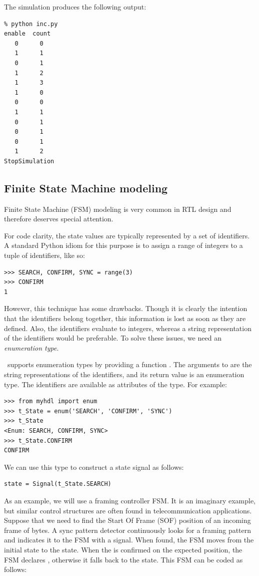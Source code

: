 The simulation produces the following output:
\begin{verbatim}
% python inc.py
enable  count
   0      0
   1      1
   0      1
   1      2
   1      3
   1      0
   0      0
   1      1
   0      1
   0      1
   0      1
   1      2
StopSimulation
\end{verbatim}


\subsection{Finite State Machine modeling \label{model-fsm}}

Finite State Machine (FSM) modeling is very common in RTL
design and therefore deserves special attention.

For code clarity, the state values are typically represented by a set
of identifiers. A standard Python idiom for this purpose is to assign
a range of integers to a tuple of identifiers, like so:

\begin{verbatim}
>>> SEARCH, CONFIRM, SYNC = range(3)
>>> CONFIRM
1
\end{verbatim}

However, this technique has some drawbacks. Though it is clearly
the intention that the identifiers belong together, this information
is lost as soon as they are defined. Also, the identifiers evaluate to
integers, whereas a string representation of the identifiers
would be preferable. To solve these issues, we need an
\emph{enumeration type}.

\myhdl\ supports enumeration types by providing a function
.  The arguments to  are the string
representations of the identifiers, and its return value is an
enumeration type. The identifiers are available as attributes of the
type. For example:

\begin{verbatim}
>>> from myhdl import enum
>>> t_State = enum('SEARCH', 'CONFIRM', 'SYNC')
>>> t_State
<Enum: SEARCH, CONFIRM, SYNC>
>>> t_State.CONFIRM
CONFIRM
\end{verbatim}

We can use this type to construct a state signal as follows:

\begin{verbatim}
state = Signal(t_State.SEARCH)
\end{verbatim}

As an example, we will use a framing controller FSM.  It is an
imaginary example, but similar control structures are often found in
telecommunication applications. Suppose that we need to find the
Start Of Frame (SOF) position of an incoming frame of bytes.
A sync pattern detector continuously looks for a framing
pattern and indicates it to the FSM with a  signal. When
found, the FSM moves from the initial  state to the
 state. When the 
is confirmed on the expected position, the FSM declares ,
otherwise it falls back to the  state.  This FSM can be
coded as follows:

